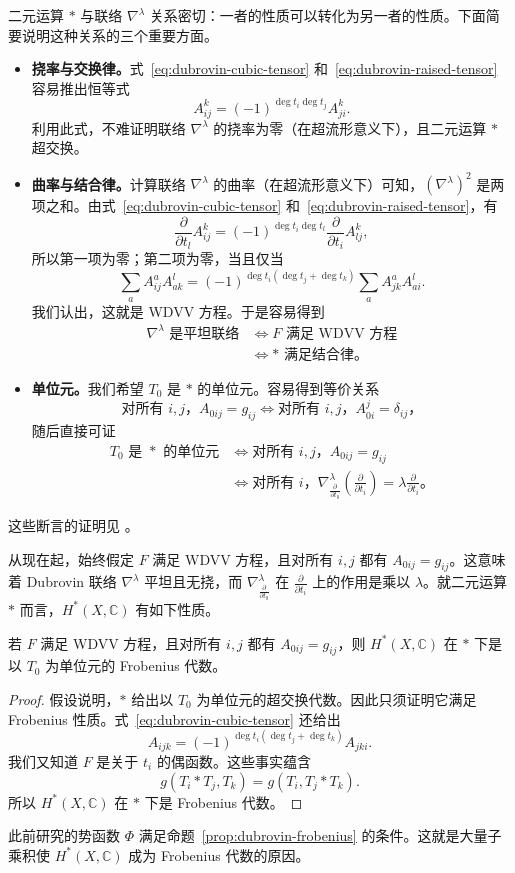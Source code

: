 二元运算 $*$ 与联络 $\nabla^\lambda$ 关系密切：一者的性质可以转化为另一者的性质。下面简要说明这种关系的三个重要方面。
\begin{itemize}
\item \textbf{挠率与交换律。}式~\eqref{eq:dubrovin-cubic-tensor} 和~\eqref{eq:dubrovin-raised-tensor} 容易推出恒等式
\[
A_{ij}^k=(-1)^{\deg t_i\deg t_j}A_{ji}^k.
\]
利用此式，不难证明联络 $\nabla^\lambda$ 的挠率为零（在超流形意义下），且二元运算 $*$ 超交换。
\item \textbf{曲率与结合律。}计算联络 $\nabla^\lambda$ 的曲率（在超流形意义下）可知，$(\nabla^\lambda)^2$ 是两项之和。由式~\eqref{eq:dubrovin-cubic-tensor} 和~\eqref{eq:dubrovin-raised-tensor}，有
\[
\frac{\partial}{\partial t_l}A_{ij}^k
=(-1)^{\deg t_i\deg t_l}\frac{\partial}{\partial t_i}A_{lj}^k,
\]
所以第一项为零；第二项为零，当且仅当
\[
\sum_aA_{ij}^aA_{ak}^l
=(-1)^{\deg t_i(\deg t_j+\deg t_k)}\sum_aA_{jk}^aA_{ai}^l.
\]
我们认出，这就是 WDVV 方程。于是容易得到
\[
\begin{aligned}
\text{$\nabla^\lambda$ 是平坦联络}
&\Longleftrightarrow\text{$F$ 满足 WDVV 方程}\\
&\Longleftrightarrow\text{$*$ 满足结合律。}
\end{aligned}
\]
\item \textbf{单位元。}我们希望 $T_0$ 是 $*$ 的单位元。容易得到等价关系
\[
\text{对所有 $i,j$，$A_{0ij}=g_{ij}$}
\Longleftrightarrow\text{对所有 $i,j$，$A_{0i}^j=\delta_{ij}$，}
\]
随后直接可证
\[
\begin{aligned}
\text{$T_0$ 是 $*$ 的单位元}
&\Longleftrightarrow\text{对所有 $i,j$，$A_{0ij}=g_{ij}$}\\
&\Longleftrightarrow\text{对所有 $i$，$\nabla^\lambda_{\frac{\partial}{\partial t_0}}
\left(\frac{\partial}{\partial t_i}\right)=\lambda\frac{\partial}{\partial t_i}$。}
\end{aligned}
\]
\end{itemize}
这些断言的证明见 。

从现在起，始终假定 $F$ 满足 WDVV 方程，且对所有 $i,j$ 都有 $A_{0ij}=g_{ij}$。这意味着 Dubrovin 联络 $\nabla^\lambda$ 平坦且无挠，而 $\nabla^\lambda_{\frac{\partial}{\partial t_0}}$ 在 $\frac{\partial}{\partial t_i}$ 上的作用是乘以 $\lambda$。就二元运算 $*$ 而言，$H^*(X,\mathbb C)$ 有如下性质。
\begin{proposition}\label{prop:dubrovin-frobenius}
若 $F$ 满足 WDVV 方程，且对所有 $i,j$ 都有 $A_{0ij}=g_{ij}$，则 $H^*(X,\mathbb C)$ 在 $*$ 下是以 $T_0$ 为单位元的 Frobenius 代数。
\end{proposition}
\begin{proof}
假设说明，$*$ 给出以 $T_0$ 为单位元的超交换代数。因此只须证明它满足 Frobenius 性质。式~\eqref{eq:dubrovin-cubic-tensor} 还给出
\[
A_{ijk}=(-1)^{\deg t_i(\deg t_j+\deg t_k)}A_{jki}.
\]
我们又知道 $F$ 是关于 $t_i$ 的偶函数。这些事实蕴含
\[
g(T_i*T_j,T_k)=g(T_i,T_j*T_k).
\]
所以 $H^*(X,\mathbb C)$ 在 $*$ 下是 Frobenius 代数。
\end{proof}
此前研究的势函数 $\Phi$ 满足命题~\ref{prop:dubrovin-frobenius} 的条件。这就是大量子乘积使 $H^*(X,\mathbb C)$ 成为 Frobenius 代数的原因。


